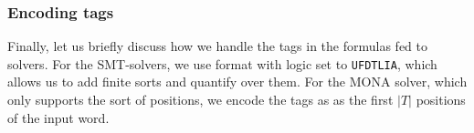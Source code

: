 \subsubsection{Encoding tags} Finally, let us briefly discuss how we handle the tags in the formulas fed to solvers.
For the SMT-solvers, we use  format with logic set to \texttt{UFDTLIA}, which allows us to add finite sorts and quantify over them.
For the MONA solver, which only supports the sort of positions, we encode the tags as as the first $|T|$ positions of the input word.






